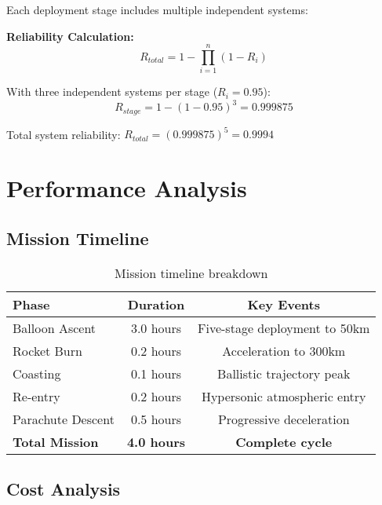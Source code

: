 \documentclass[11pt,a4paper]{article}
\begin{document}
Each deployment stage includes multiple independent systems:

\textbf{Reliability Calculation:}
\begin{equation}
R_{total} = 1 - \prod_{i=1}^{n} (1 - R_i)
\end{equation}

With three independent systems per stage ($R_i = 0.95$):
\begin{equation}
R_{stage} = 1 - (1 - 0.95)^3 = 0.999875
\end{equation}

Total system reliability: $R_{total} = (0.999875)^5 = 0.9994$

\section{Performance Analysis}

\subsection{Mission Timeline}

\begin{table}[H]
\centering
\begin{tabular}{@{}lcc@{}}
\toprule
\textbf{Phase} & \textbf{Duration} & \textbf{Key Events} \\
\midrule
Balloon Ascent & 3.0 hours & Five-stage deployment to 50km \\
Rocket Burn & 0.2 hours & Acceleration to 300km \\
Coasting & 0.1 hours & Ballistic trajectory peak \\
Re-entry & 0.2 hours & Hypersonic atmospheric entry \\
Parachute Descent & 0.5 hours & Progressive deceleration \\
\textbf{Total Mission} & \textbf{4.0 hours} & \textbf{Complete cycle} \\
\bottomrule
\end{tabular}
\caption{Mission timeline breakdown}
\label{tab:timeline}
\end{table}

\subsection{Cost Analysis}
\end{document}
